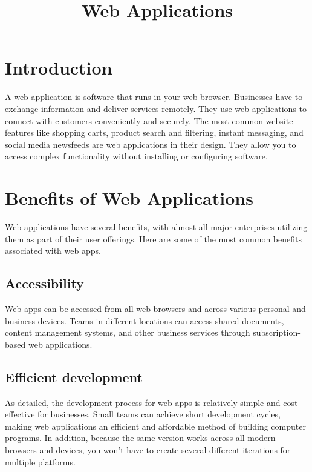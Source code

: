 \documentclass[conference]{IEEEtran}
\begin{document}
\title{Web Applications}

\author{
}

\maketitle

\section{Introduction}
A web application is software that runs in your web browser. Businesses have to exchange information and deliver services remotely. They use web applications to connect with customers conveniently and securely. The most common website features like shopping carts, product search and filtering, instant messaging, and social media newsfeeds are web applications in their design. They allow you to access complex functionality without installing or configuring software.

\section{Benefits of Web Applications}
Web applications have several benefits, with almost all major enterprises utilizing them as part of their user offerings. Here are some of the most common benefits associated with web apps.

\subsection{Accessibility}
Web apps can be accessed from all web browsers and across various personal and business devices. Teams in different locations can access shared documents, content management systems, and other business services through subscription-based web applications. 

\subsection{Efficient development}
As detailed, the development process for web apps is relatively simple and cost-effective for businesses. Small teams can achieve short development cycles, making web applications an efficient and affordable method of building computer programs. In addition, because the same version works across all modern browsers and devices, you won't have to create several different iterations for multiple platforms.
\end{document}
